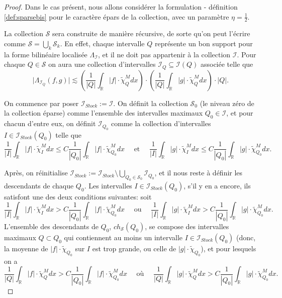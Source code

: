 \documentclass[11pt]{amsart}
\newcommand{\rr}{\mathbb}
\newcommand{\ii}{\mathscr}
\newcommand{\ic}{\mathcal}
\newcommand{\ci}{\tilde{\chi}}
\begin{document}
\begin{proof}
 Dans le cas pr\'esent, nous allons consid\'erer la formulation - d\'efinition \ref{def:sparsebis} pour le caract\`ere \'epars de la collection, avec un param\`etre $\eta=\frac{1}{2}$.

La collection $\ic S$ sera construite de mani\`ere r\'ecursive, de sorte qu'on peut l'\'ecrire comme $\ic S =\bigcup_k \ic S_k$. En effet, chaque intervalle $Q$ 
repr\'esente un bon support pour la forme bilin\'eaire localis\'ee $\Lambda_{\ii I}$, et il ne doit pas appartenir \`a la collection $\ii I$. Pour chaque $Q \in \ic S$ on aura une collection d'intervalles $\ii I_Q \subseteq \ii I (Q)$ associ\'ee telle que 
\[
\big| \Lambda_{\ii I_Q}(f, g)  \big| \lesssim \left(\frac{1}{|Q|} \int_{\rr R} |f|\cdot \ci_{Q}^M dx \right) \cdot \left(\frac{1}{|Q|} \int_{\rr R} |g|\cdot \ci_{Q}^M dx \right) \cdot |Q|.
\]

On commence par poser $\ii I_{Stock}:=\ii I$. On d\'efinit la collection $\ic S_0$ (le niveau z\'ero de la collection \'eparse) comme l'ensemble des intervalles maximaux $Q_0 \in \ii{I}$, et pour chacun d'entre eux, on d\'efinit $\ii I_{Q_0}$ comme la collection d'intervalles  $I \in \ii I_{Stock}(Q_0)$ telle que
\begin{equation}
\label{eq:condition}
\frac{1}{|I|} \int_{\rr R} |f| \cdot \ci_I^M dx \leq C \frac{1}{|Q_0|} \int_{\rr R} |f| \cdot \ci_{Q_0}^M dx \quad   \text{    et     } \quad \frac{1}{|I|} \int_{\rr R} |g| \cdot \ci_I^M dx \leq C \frac{1}{|Q_0|} \int_{\rr R} |g| \cdot \ci_{Q_0}^M dx.
\end{equation}

Apr\`es, on r\'einitialise $\ii I_{Stock}:= \ii I_{Stock} \setminus \bigcup_{Q_0 \in \ic S_0} \ii I_{Q_0}$, et il nous reste \`a d\'efinir les descendants de chaque $Q_0$. Les intervalles $I \in \ii I_{Stock}(Q_0)$, s'il y en a encore, ils satisfont une des deux conditions suivantes: soit
\[
 \frac{1}{|I|} \int_{\rr R} |f| \cdot \ci_I^M dx > C \frac{1}{|Q_0|} \int_{\rr R} |f| \cdot \ci_{Q_0}^M dx \quad \text{ ou  } \quad \frac{1}{|I|} \int_{\rr R} |g| \cdot \ci_I^M dx > C \frac{1}{|Q_0|} \int_{\rr R} |g| \cdot \ci_{Q_0}^M dx.
 \] 
L'ensemble des descendants de $Q_0$, $ch_{\ic S}(Q_0)$, se compose des intervalles maximaux $Q \subset Q_0$ qui contiennent au moins un intervalle $I \in \ii I_{Stock}(Q_0)$ (donc, la moyenne de $|f| \cdot \ci_{Q_0}$ sur $I$ est trop grande, ou celle de $|g| \cdot \ci_{Q_0}$), et pour lesquels on a 
\[
 \frac{1}{|Q|} \int_{\rr R} |f| \cdot \ci_Q^M dx > C \frac{1}{|Q_0|} \int_{\rr R} |f| \cdot \ci_{Q_0}^M dx \quad \text{ o\`u  } \quad \frac{1}{|Q|} \int_{\rr R} |g| \cdot \ci_Q^M dx > C \frac{1}{|Q_0|} \int_{\rr R} |g| \cdot \ci_{Q_0}^M dx.
 \] 


\end{proof}
\end{document}
